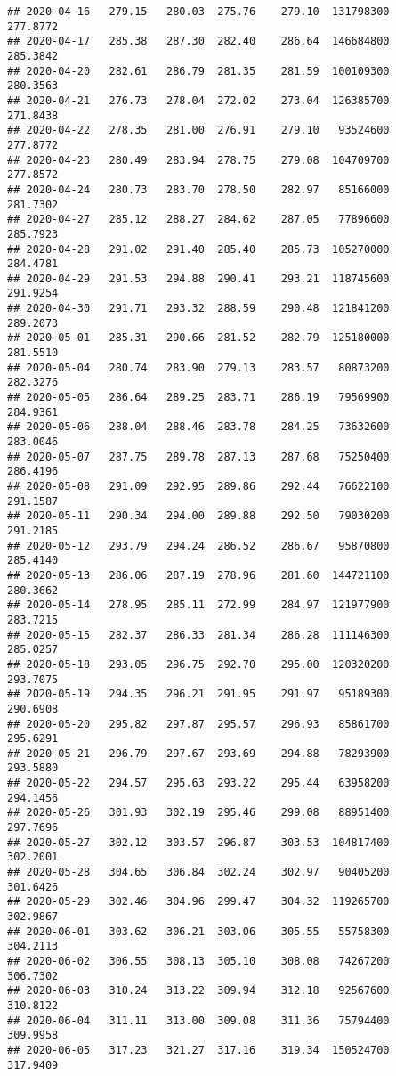 \documentclass[
]{article}
\begin{document}
\begin{verbatim}
## 2020-04-16   279.15   280.03  275.76    279.10  131798300     277.8772
## 2020-04-17   285.38   287.30  282.40    286.64  146684800     285.3842
## 2020-04-20   282.61   286.79  281.35    281.59  100109300     280.3563
## 2020-04-21   276.73   278.04  272.02    273.04  126385700     271.8438
## 2020-04-22   278.35   281.00  276.91    279.10   93524600     277.8772
## 2020-04-23   280.49   283.94  278.75    279.08  104709700     277.8572
## 2020-04-24   280.73   283.70  278.50    282.97   85166000     281.7302
## 2020-04-27   285.12   288.27  284.62    287.05   77896600     285.7923
## 2020-04-28   291.02   291.40  285.40    285.73  105270000     284.4781
## 2020-04-29   291.53   294.88  290.41    293.21  118745600     291.9254
## 2020-04-30   291.71   293.32  288.59    290.48  121841200     289.2073
## 2020-05-01   285.31   290.66  281.52    282.79  125180000     281.5510
## 2020-05-04   280.74   283.90  279.13    283.57   80873200     282.3276
## 2020-05-05   286.64   289.25  283.71    286.19   79569900     284.9361
## 2020-05-06   288.04   288.46  283.78    284.25   73632600     283.0046
## 2020-05-07   287.75   289.78  287.13    287.68   75250400     286.4196
## 2020-05-08   291.09   292.95  289.86    292.44   76622100     291.1587
## 2020-05-11   290.34   294.00  289.88    292.50   79030200     291.2185
## 2020-05-12   293.79   294.24  286.52    286.67   95870800     285.4140
## 2020-05-13   286.06   287.19  278.96    281.60  144721100     280.3662
## 2020-05-14   278.95   285.11  272.99    284.97  121977900     283.7215
## 2020-05-15   282.37   286.33  281.34    286.28  111146300     285.0257
## 2020-05-18   293.05   296.75  292.70    295.00  120320200     293.7075
## 2020-05-19   294.35   296.21  291.95    291.97   95189300     290.6908
## 2020-05-20   295.82   297.87  295.57    296.93   85861700     295.6291
## 2020-05-21   296.79   297.67  293.69    294.88   78293900     293.5880
## 2020-05-22   294.57   295.63  293.22    295.44   63958200     294.1456
## 2020-05-26   301.93   302.19  295.46    299.08   88951400     297.7696
## 2020-05-27   302.12   303.57  296.87    303.53  104817400     302.2001
## 2020-05-28   304.65   306.84  302.24    302.97   90405200     301.6426
## 2020-05-29   302.46   304.96  299.47    304.32  119265700     302.9867
## 2020-06-01   303.62   306.21  303.06    305.55   55758300     304.2113
## 2020-06-02   306.55   308.13  305.10    308.08   74267200     306.7302
## 2020-06-03   310.24   313.22  309.94    312.18   92567600     310.8122
## 2020-06-04   311.11   313.00  309.08    311.36   75794400     309.9958
## 2020-06-05   317.23   321.27  317.16    319.34  150524700     317.9409

\end{verbatim}
\end{document}
